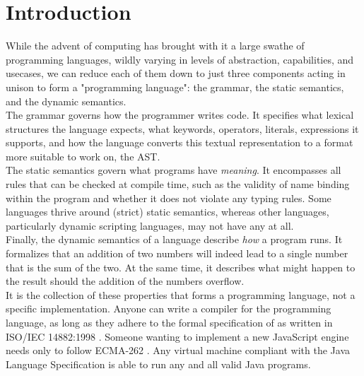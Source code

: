 
\chapter{\label{ch:introduction}Introduction}


While the advent of computing has brought with it a large swathe of programming languages, wildly varying in levels of abstraction, capabilities, and usecases, we can reduce each of them down to just three components acting in unison to form a "programming language": the grammar, the static semantics, and the dynamic semantics.\\

The grammar governs how the programmer writes code. It specifies what lexical structures the language expects, what keywords, operators, literals, expressions it supports, and how the language converts this textual representation to a format more suitable to work on, the \ac{AST}.\\

The static semantics govern what programs have \textit{meaning}. It encompasses all rules that can be checked at compile time, such as the validity of name binding within the program and whether it does not violate any typing rules. Some languages thrive around (strict) static semantics, whereas other languages, particularly dynamic scripting languages, may not have any at all.\\

Finally, the dynamic semantics of a language describe \textit{how} a program runs. It formalizes that an addition of two numbers will indeed lead to a single number that is the sum of the two. At the same time, it describes what might happen to the result should the addition of the numbers overflow.\\


It is the collection of these properties that forms a programming language, not a specific implementation. Anyone can write a compiler for the  programming language, as long as they adhere to the formal specification of  as written in ISO/IEC 14882:1998 \cite{ISO:1998:IIP}. Someone wanting to implement a new JavaScript engine needs only to follow ECMA-262 \cite{ecma1999262}. Any virtual machine compliant with the Java Language Specification \cite{10.5555/2636997} is able to run any and all valid Java programs.\\

